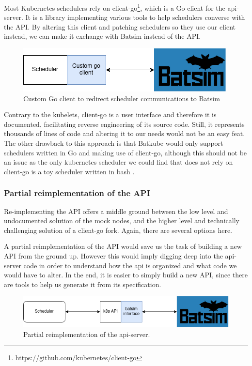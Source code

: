 Most Kubernetes schedulers rely on
client-go\footnote{https://github.com/kubernetes/client-go}, which is a Go
client for the api-server. It is a library implementing various tools to help
schedulers converse with the API. By altering this client and patching
schedulers so they use our client instead, we can make it exchange with Batsim
instead of the API. 

\begin{figure}[h]
	\centering
	\includegraphics[scale=0.8]{imgs/custom-go-client.png}
	\caption{Custom Go client to redirect scheduler communications to Batsim}
	\label{fig:custom-go-client}
\end{figure}

Contrary to the kubelets, client-go is a user interface and therefore it is
documented, facilitating reverse engineering of its source code. Still, it
represents thousands of lines of code and altering it to our needs would not be
an easy feat.  The other drawback to this approach is that Batkube would only
support schedulers written in Go and making use of client-go, although this
should not be an issue as the only kubernetes scheduler we could find that does
not rely on client-go is a toy scheduler written in bash \cite{bash-scheduler}.

\subsubsection{Partial reimplementation of the API}

Re-implementing the API offers a middle ground between the low level and
undocumented solution of the mock nodes, and the higher level and technically
challenging solution of a client-go fork. Again, there are several options here.

A partial reimplementation of the API would save us the task of building a new
API from the ground up. However this would imply digging deep into the
api-server code in order to understand how the api is organized and what code
we would have to alter. In the end, it is easier to simply build a new API,
since there are tools to help us generate it from its specification.

\begin{figure}[h]
	\centering
	\includegraphics[scale=0.8]{imgs/partial-reimplem.png}
	\caption{Partial reimplementation of the api-server.}
	\label{fig:partial_reimp}
\end{figure}

